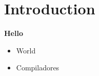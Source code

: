 \section{Introduction} 
\textbf{Hello}
\begin{itemize}
  \item World
  \item Compiladores
\end{itemize}